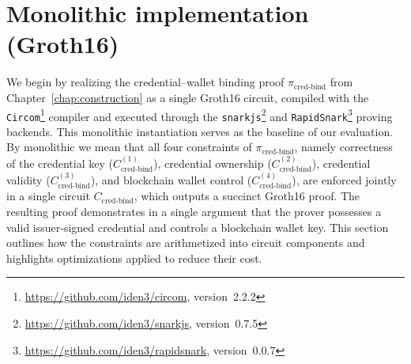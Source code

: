\section{Monolithic implementation (Groth16)}
\label{sec:monolithic}
We begin by realizing the credential–wallet binding proof $\pi_{\text{cred-bind}}$ from Chapter~\ref{chap:construction} as a single Groth16 circuit, compiled with the \texttt{Circom}\footnote{\url{https://github.com/iden3/circom}, version~2.2.2} compiler and executed through the \texttt{snarkjs}\footnote{\url{https://github.com/iden3/snarkjs}, version~0.7.5} and \texttt{RapidSnark}\footnote{\url{https://github.com/iden3/rapidsnark}, version~0.0.7} proving backends. This monolithic instantiation serves as the baseline of our evaluation. By monolithic we mean that all four constraints of $\pi_{\text{cred-bind}}$, namely correctness of the credential key ($C_{\text{cred-bind}}^{(1)}$), credential ownership ($C_{\text{cred-bind}}^{(2)}$), credential validity ($C_{\text{cred-bind}}^{(3)}$), and blockchain wallet control ($C_{\text{cred-bind}}^{(4)}$), are enforced jointly in a single circuit $C_{\text{cred-bind}}$, which outputs a succinct Groth16 proof. The resulting proof demonstrates in a single argument that the prover possesses a valid issuer-signed credential and controls a blockchain wallet key. This section outlines how the constraints are arithmetized into circuit components and highlights optimizations applied to reduce their cost.

